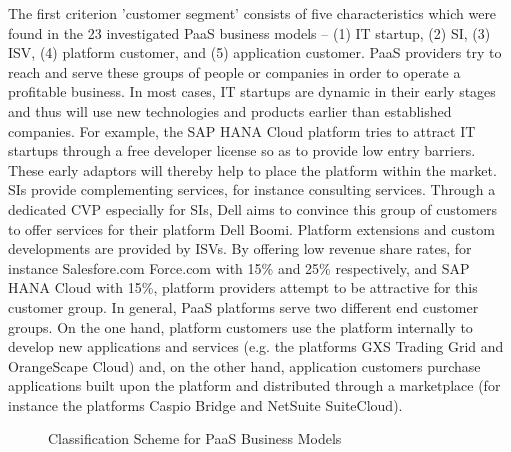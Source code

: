 The first criterion 'customer segment' consists of five characteristics which were found in the 23 investigated \ac{PaaS} business models --  (1) \ac{IT} startup, (2) \ac{SI}, (3) \ac{ISV}, (4) platform customer, and (5) application customer. \ac{PaaS} providers try to reach and serve these groups of people or companies in order to operate a profitable business. In most cases, \ac{IT} startups are dynamic in their early stages and thus will use new technologies and products earlier than established companies. For example, the SAP HANA Cloud platform tries to attract \ac{IT} startups through a free developer license so as to provide low entry barriers. These early adaptors will thereby help to place the platform within the market. \acp{SI} provide complementing services, for instance consulting services. Through a dedicated \ac{CVP} especially for \acp{SI}, Dell aims to convince this group of customers to offer services for their platform Dell Boomi. Platform extensions and custom developments are provided by \acp{ISV}. By offering low revenue share rates, for instance Salesfore.com Force.com with 15\% and 25\% respectively, and SAP HANA Cloud with 15\%, platform providers attempt to be attractive for this customer group. In general, \ac{PaaS} platforms serve two different end customer groups. On the one hand, platform customers use the platform internally to develop new applications and services (e.g. the platforms GXS Trading Grid and OrangeScape Cloud) and, on the other hand, application customers purchase applications built upon the platform and distributed through a marketplace (for instance the platforms Caspio Bridge and NetSuite SuiteCloud).

\begin{figure}[tb]
	\centering
	
	\caption{Classification Scheme for PaaS Business Models}
	\label{fig:cs}
\end{figure}

